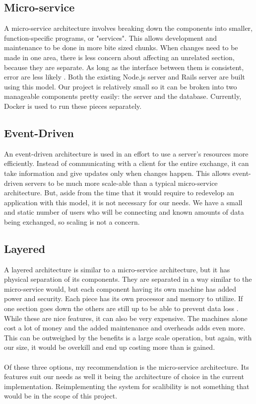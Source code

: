 \documentclass[draftclsnofoot,onecolumn,10pt]{IEEEtran}
\begin{document}
        \subsection{Micro-service} A micro-service architecture involves breaking down the components into smaller, function-specific programs, or "services". This allows development and maintenance to be done in more bite sized chunks. When changes need to be made in one area, there is less concern about affecting an unrelated section, because they are separate. As long as the interface between them is consistent, error are less likely \cite{microserv}. Both the existing Node.js server and Rails server are built using this model. Our project is relatively small so it can be broken into two manageable components pretty easily: the server and the database. Currently, Docker is used to run these pieces separately.
        \subsection{Event-Driven}
            An event-driven architecture is used in an effort to use a server's resources more efficiently. Instead of communicating with a client for the entire exchange, it can take information and give updates only when changes happen. This allows event-driven servers to be much more scale-able than a typical micro-service architecture. But, aside from the time that it would require to redevelop an application with this model, it is not necessary for our needs. We have a small and static number of users who will be connecting and known amounts of data being exchanged, so scaling is not a concern.

        \subsection{Layered}
            A layered architecture is similar to a micro-service architecture, but it has physical separation of its components. They are separated in a way similar to the micro-service would, but each component having its own machine has added power and security. Each piece has its own processor and memory to utilize. If one section goes down the others are still up to be able to prevent data loss \cite{multilayer}. While these are nice features, it can also be very expensive. The machines alone cost a lot of money and the added maintenance and overheads adds even more. This can be outweighed by the benefits is a large scale operation, but again, with our size, it would be overkill and end up costing more than is gained.
\\\\
        \indent Of these three options, my recommendation is the micro-service architecture. Its features suit our needs as well it being the architecture of choice in the current implementation. Reimplementing the system for scalibility is not something that would be in the scope of this project.
\end{document}
